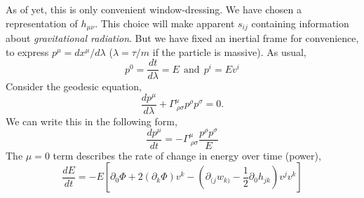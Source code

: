 As of yet, this is only convenient window-dressing. We have chosen a representation of $h_{\mu\nu}$. This choice will make apparent $s_{ij}$ containing information about \textit{gravitational radiation}. But we have fixed an inertial frame for convenience, to express $p^{\mu} = dx^{\mu}/d\lambda$ ($\lambda = \tau/m$ if the particle is massive). As usual, 
\begin{equation}\nonumber
    p^0 = \frac{dt}{d\lambda} = E \ \ \text{and} \ \ p^i = Ev^i
\end{equation}
Consider the geodesic equation,
\begin{equation}\nonumber
    \frac{dp^{\mu}}{d\lambda} + \Gamma^{\mu}_{\ \rho\sigma}p^{\rho}p^{\sigma}=0.
\end{equation}
We can write this in the following form, 
\begin{equation}\nonumber
    \frac{dp^{\mu}}{dt} = -\Gamma^{\mu}_{\ \rho\sigma}\frac{p^{\rho}p^{\sigma}}{E}
\end{equation}
The $\mu=0$ term describes the rate of change in energy over time (power),
\begin{equation}\nonumber
    \frac{dE}{dt} = -E\left[\partial_0\Phi + 2(\partial_k\Phi)v^k  - \left(\partial_{(j}w_{k)} - \frac{1}{2}\partial_{0}h_{jk}\right)v^jv^k\right]
\end{equation}

